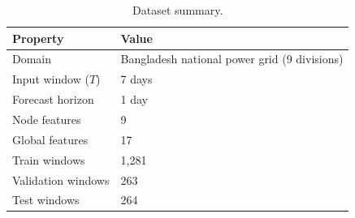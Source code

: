 \begin{table}[!t]
\caption{Dataset summary.}
\label{tab:1}
\centering
\small
\renewcommand{\arraystretch}{1.2}
\begin{tabular}{|l|l|}
\hline
\textbf{Property} & \textbf{Value} \\
\hline
Domain & Bangladesh national power grid (9 divisions) \\
Input window ($T$) & 7 days \\
Forecast horizon & 1 day \\
Node features & 9 \\
Global features & 17 \\
Train windows & 1,281 \\
Validation windows & 263 \\
Test windows & 264 \\
\hline
\end{tabular}
\end{table}
